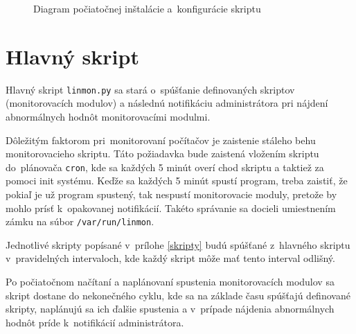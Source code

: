 \begin{figure}[H]
	\begin{center}
		\caption{Diagram počiatočnej inštalácie a~konfigurácie skriptu}
		\label{script_install}
	\end{center}
\end{figure}

\section{Hlavný skript}
\label{hlavny_skript}
Hlavný skript \texttt{linmon.py} sa stará o~spúšťanie definovaných skriptov (monitorovacích modulov) a následnú notifikáciu administrátora pri nájdení abnormálnych hodnôt monitorovacími modulmi.

Dôležitým faktorom pri~monitorovaní počítačov je zaistenie stáleho behu monitorovacieho skriptu. Táto požiadavka bude zaistená vložením skriptu do~plánovača \texttt{cron}, kde sa každých 5 minút overí chod skriptu a taktiež za pomoci init systému. Keďže sa každých 5 minút spustí program, treba zaistiť, že pokiaľ je už program spustený, tak nespustí monitorovacie moduly, pretože by mohlo prísť k~opakovanej notifikácií. Takéto správanie sa docieli umiestnením zámku na súbor \texttt{/var/run/linmon}.

Jednotlivé skripty popísané v~prílohe \ref{skripty} budú spúšťané z~hlavného skriptu v~pravidelných intervaloch, kde každý skript môže mať tento interval odlišný.

Po počiatočnom načítaní a naplánovaní spustenia monitorovacích modulov sa skript dostane do nekonečného cyklu, kde sa na základe času spúšťajú definované skripty, naplánujú sa ich ďalšie spustenia a v~prípade nájdenia abnormálnych hodnôt príde k~notifikácií administrátora.

